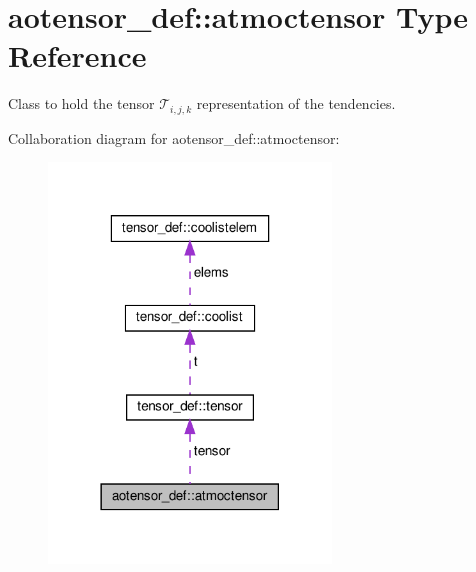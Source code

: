 \hypertarget{structaotensor__def_1_1atmoctensor}{}\section{aotensor\+\_\+def\+:\+:atmoctensor Type Reference}
\label{structaotensor__def_1_1atmoctensor}


Class to hold the tensor $\mathcal{T}_{i,j,k}$ representation of the tendencies.  




Collaboration diagram for aotensor\+\_\+def\+:\+:atmoctensor\+:\nopagebreak
\begin{figure}[H]
\begin{center}
\leavevmode
\includegraphics[width=213pt]{structaotensor__def_1_1atmoctensor__coll__graph}
\end{center}
\end{figure}
